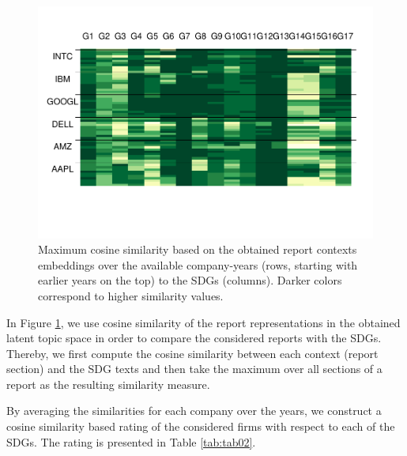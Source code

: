 \documentclass[
]{article}
\begin{document}
\begin{figure}
\centering
\includegraphics{20210219_sustain_dim_files/figure-latex/figcos-1.pdf}
\caption{\label{fig:figcos}Maximum cosine similarity based on the obtained report contexts embeddings over the available company-years (rows, starting with earlier years on the top) to the SDGs (columns). Darker colors correspond to higher similarity values.}
\end{figure}

In Figure \ref{fig:figcos}, we use cosine similarity of the report representations in the obtained latent topic space in order to compare the considered reports with the SDGs. Thereby, we first compute the cosine similarity between each context (report section) and the SDG texts and then take the maximum over all sections of a report as the resulting similarity measure.

By averaging the similarities for each company over the years, we construct a cosine similarity based rating of the considered firms with respect to each of the SDGs. The rating is presented in Table \ref{tab:tab02}.
\end{document}
